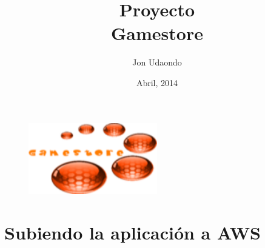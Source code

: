\documentclass[a4paper,10pt]{scrartcl}
\begin{document}
\chead{}

\title{Proyecto \\ Gamestore}  %
\author{Jon Udaondo}       %
\date{Abril, 2014}
\maketitle
\begin{figure}%
\centering
\includegraphics[width=0.5\textwidth] {tituloo.png}
\label{fig:titulo}
\end{figure}

\renewcommand{\tablename}{Tabla}
\renewcommand{\lstlistingname}{Código}
\renewcommand{\contentsname}{Contenido}
\renewcommand{\figurename}{Fig.}
\renewcommand{\refname}{Referencias}
\pagebreak
\tableofcontents


\pagebreak
\section{Subiendo la aplicación a AWS}
\end{document}
